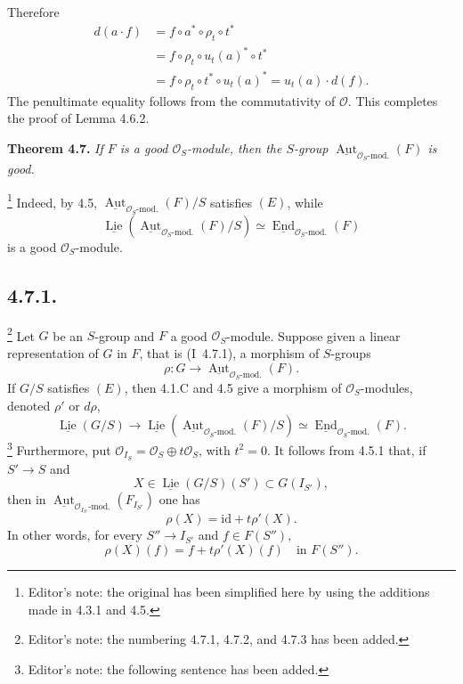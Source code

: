 Therefore
\[
\begin{aligned}
 d(a\cdot f)
 &=f\circ a^*\circ\rho_t\circ t^*\\
 &=f\circ\rho_t\circ u_t(a)^*\circ t^*\\
 &=f\circ\rho_t\circ t^*\circ u_t(a)^*
  =u_t(a)\cdot d(f).
\end{aligned}
\]
The penultimate equality follows from the commutativity of
\(\mathcal O\). This completes the proof of Lemma 4.6.2.

\medskip
\noindent\textbf{Theorem 4.7.}
\textit{If \(F\) is a good \(\mathcal O_S\)-module, then the
\(S\)-group
\(\underline{\operatorname{Aut}}_{\mathcal O_S\text{-mod.}}(F)\)
is good.}

\footnote{Editor's note: the original has been simplified here by using
the additions made in 4.3.1 and 4.5.}
Indeed, by 4.5,
\(\underline{\operatorname{Aut}}_{\mathcal O_S\text{-mod.}}(F)/S\)
satisfies \((E)\), while
\[
 \underline{\operatorname{Lie}}\!
  \left(\underline{\operatorname{Aut}}_{\mathcal O_S\text{-mod.}}(F)/S\right)
 \simeq
 \underline{\operatorname{End}}_{\mathcal O_S\text{-mod.}}(F)
\]
is a good \(\mathcal O_S\)-module.

\subsection*{4.7.1.}
\footnote{Editor's note: the numbering 4.7.1, 4.7.2, and 4.7.3 has
been added.}
Let \(G\) be an \(S\)-group and \(F\) a good
\(\mathcal O_S\)-module. Suppose given a linear representation of
\(G\) in \(F\), that is (I~4.7.1), a morphism of \(S\)-groups
\[
 \rho:G\longrightarrow
 \underline{\operatorname{Aut}}_{\mathcal O_S\text{-mod.}}(F).
\]
If \(G/S\) satisfies \((E)\), then 4.1.C and 4.5 give a morphism of
\(\mathcal O_S\)-modules, denoted \(\rho'\) or \(d\rho\),
\[
 \underline{\operatorname{Lie}}(G/S)
 \longrightarrow
 \underline{\operatorname{Lie}}\!
  \left(\underline{\operatorname{Aut}}_{\mathcal O_S\text{-mod.}}(F)/S\right)
 \simeq
 \underline{\operatorname{End}}_{\mathcal O_S\text{-mod.}}(F).
\]
\footnote{Editor's note: the following sentence has been added.}
Furthermore, put
\(\mathcal O_{I_S}=\mathcal O_S\oplus t\mathcal O_S\), with
\(t^2=0\). It follows from 4.5.1 that, if \(S'\to S\) and
\[
 X\in\underline{\operatorname{Lie}}(G/S)(S')\subset G(I_{S'}),
\]
then in
\(\underline{\operatorname{Aut}}_{\mathcal O_{I_{S'}}\text{-mod.}}
(F_{I_{S'}})\) one has
\begin{equation*}
 \rho(X)=\mathrm{id}+t\rho'(X).
 \tag{*}
\end{equation*}
In other words, for every \(S''\to I_{S'}\) and \(f\in F(S'')\),
\[
 \rho(X)(f)=f+t\rho'(X)(f)
 \quad\text{in }F(S'').
\]

